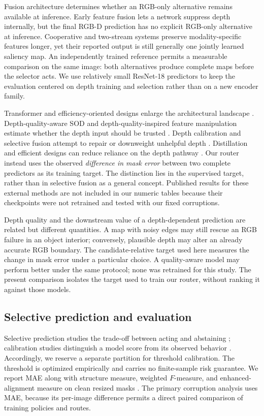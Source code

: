 \documentclass[11pt]{article}
\begin{document}
Fusion architecture determines whether an RGB-only alternative remains available at inference. Early feature fusion lets a network suppress depth internally, but the final RGB-D prediction has no explicit RGB-only alternative at inference. Cooperative and two-stream systems preserve modality-specific features longer, yet their reported output is still generally one jointly learned saliency map. An independently trained reference permits a measurable comparison on the same image: both alternatives produce complete maps before the selector acts. We use relatively small ResNet-18 predictors to keep the evaluation centered on depth training and selection rather than on a new encoder family.

Transformer and efficiency-oriented designs enlarge the architectural landscape \cite{vst,swinnet,caver,tritrans,singlestream,siamese,moadnet}. Depth-quality-aware SOD and depth-quality-inspired feature manipulation estimate whether the depth input should be trusted \cite{dqas,dqfm,dpanet,cdnet}. Depth calibration and selective fusion attempt to repair or downweight unhelpful depth \cite{dcf,calibrateddepth,twophase,dsn,cmms,ssf}. Distillation and efficient designs can reduce reliance on the depth pathway \cite{a2dele,mobilesal}. Our router instead uses the observed \emph{difference in mask error} between two complete predictors as its training target. The distinction lies in the supervised target, rather than in selective fusion as a general concept. Published results for these external methods are not included in our numeric tables because their checkpoints were not retrained and tested with our fixed corruptions.

Depth quality and the downstream value of a depth-dependent prediction are related but different quantities. A map with noisy edges may still rescue an RGB failure in an object interior; conversely, plausible depth may alter an already accurate RGB boundary. The candidate-relative target used here measures the change in mask error under a particular choice. A quality-aware model may perform better under the same protocol; none was retrained for this study. The present comparison isolates the target used to train our router, without ranking it against those models.

\subsection{Selective prediction and evaluation}
Selective prediction studies the trade-off between acting and abstaining \cite{selectivenet}; calibration studies distinguish a model score from its observed behavior \cite{guo2017}. Accordingly, we reserve a separate partition for threshold calibration. The threshold is optimized empirically and carries no finite-sample risk guarantee. We report MAE along with structure measure, weighted $F$-measure, and enhanced-alignment measure on clean resized masks \cite{smeasure,weighted,emeasure}. The primary corruption analysis uses MAE, because its per-image difference permits a direct paired comparison of training policies and routes.
\end{document}
